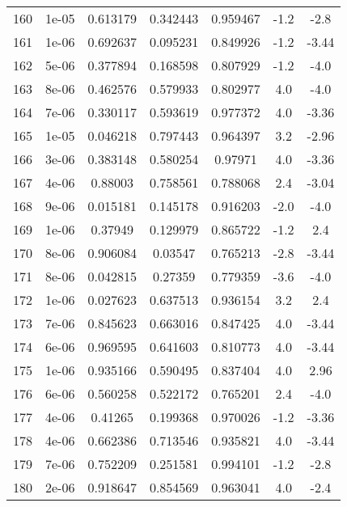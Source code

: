 \begin{table}
\begin{tabular}{c|c|c|c|c|c|c}
160 & 1e-05 & 0.613179 & 0.342443 & 0.959467 & -1.2 & -2.8\\
161 & 1e-06 & 0.692637 & 0.095231 & 0.849926 & -1.2 & -3.44\\
162 & 5e-06 & 0.377894 & 0.168598 & 0.807929 & -1.2 & -4.0\\
163 & 8e-06 & 0.462576 & 0.579933 & 0.802977 & 4.0 & -4.0\\
164 & 7e-06 & 0.330117 & 0.593619 & 0.977372 & 4.0 & -3.36\\
165 & 1e-05 & 0.046218 & 0.797443 & 0.964397 & 3.2 & -2.96\\
166 & 3e-06 & 0.383148 & 0.580254 & 0.97971 & 4.0 & -3.36\\
167 & 4e-06 & 0.88003 & 0.758561 & 0.788068 & 2.4 & -3.04\\
168 & 9e-06 & 0.015181 & 0.145178 & 0.916203 & -2.0 & -4.0\\
169 & 1e-06 & 0.37949 & 0.129979 & 0.865722 & -1.2 & 2.4\\
170 & 8e-06 & 0.906084 & 0.03547 & 0.765213 & -2.8 & -3.44\\
171 & 8e-06 & 0.042815 & 0.27359 & 0.779359 & -3.6 & -4.0\\
172 & 1e-06 & 0.027623 & 0.637513 & 0.936154 & 3.2 & 2.4\\
173 & 7e-06 & 0.845623 & 0.663016 & 0.847425 & 4.0 & -3.44\\
174 & 6e-06 & 0.969595 & 0.641603 & 0.810773 & 4.0 & -3.44\\
175 & 1e-06 & 0.935166 & 0.590495 & 0.837404 & 4.0 & 2.96\\
176 & 6e-06 & 0.560258 & 0.522172 & 0.765201 & 2.4 & -4.0\\
177 & 4e-06 & 0.41265 & 0.199368 & 0.970026 & -1.2 & -3.36\\
178 & 4e-06 & 0.662386 & 0.713546 & 0.935821 & 4.0 & -3.44\\
179 & 7e-06 & 0.752209 & 0.251581 & 0.994101 & -1.2 & -2.8\\
180 & 2e-06 & 0.918647 & 0.854569 & 0.963041 & 4.0 & -2.4\\
\end{tabular}
\end{table}
\newpage

